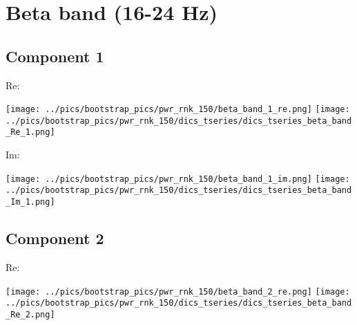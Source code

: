 \documentclass{article}
\begin{document}


\section{Beta band (16-24 Hz)}

\subsection*{Component 1}
Re:

\hspace{2cm}
\texttt{[image: ../pics/bootstrap\_pics/pwr\_rnk\_150/beta\_band\_1\_re.png]}
\hspace{2cm}
\texttt{[image: ../pics/bootstrap\_pics/pwr\_rnk\_150/dics\_tseries/dics\_tseries\_beta\_band\_Re\_1.png]}

Im:

\hspace{2cm}
\texttt{[image: ../pics/bootstrap\_pics/pwr\_rnk\_150/beta\_band\_1\_im.png]}
\hspace{2cm}
\texttt{[image: ../pics/bootstrap\_pics/pwr\_rnk\_150/dics\_tseries/dics\_tseries\_beta\_band\_Im\_1.png]}

\subsection*{Component 2}
Re:

\hspace{2cm}
\texttt{[image: ../pics/bootstrap\_pics/pwr\_rnk\_150/beta\_band\_2\_re.png]}
\hspace{2cm}
\texttt{[image: ../pics/bootstrap\_pics/pwr\_rnk\_150/dics\_tseries/dics\_tseries\_beta\_band\_Re\_2.png]}
\end{document}
